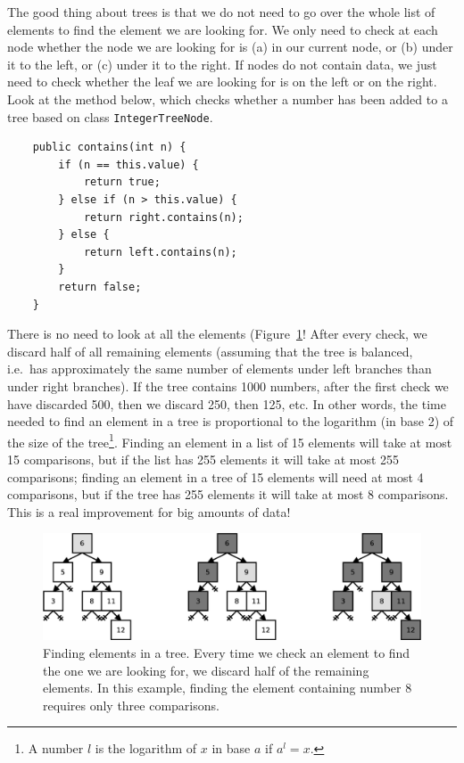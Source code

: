 The good thing about trees is that we do not need to go over the whole
list of elements to find the element we are looking for. We only need
to check at each node whether the node we are looking for is (a) in our
current node, or (b) under it to the left, or (c) under it to the right. If
nodes do not contain data, we just need to check whether the leaf we
are looking for is on the left or on the right. Look at the method
below, which checks whether a number has been added to a tree based on
class \verb+IntegerTreeNode+. 

\begin{verbatim}
    public contains(int n) {
        if (n == this.value) {
            return true;
        } else if (n > this.value) {
            return right.contains(n);
        } else {
            return left.contains(n);
        }
        return false;
    }
\end{verbatim}

There is no need to look at all the elements
(Figure~\ref{fig:fhsdhshgfhjsdg}! After every check, we
discard half of all remaining elements (assuming that the tree is
balanced, i.e.~has approximately the same number of elements under left
branches than under right branches). If the tree contains 1000
numbers, after the first check we have discarded 500, then we discard
250, then 125, etc. In other words, the time needed to find an element
in a tree is proportional to the logarithm (in base 2) of the size of
the tree\footnote{A number $l$ is the logarithm of $x$ in base $a$ if
 $a^l = x$.}. Finding an element in a list of 15 elements will take at
most 15 comparisons, but if the list has 255 elements it will take at
most 255 comparisons; finding an element in a tree of 15 elements will
need at most 4 comparisons, but if the tree has 255 elements it will
take at most 8 comparisons. This is a real improvement for big amounts
of data!

\begin{figure}[hbtp]
  \centering
  \includegraphics[width=\textwidth]{gfx/tree-find}
  \caption{Finding elements in a tree. Every time we check an element
    to find the one we are looking for, we discard half of the
    remaining elements. In this example, finding the element
    containing number 8 requires only three comparisons.}
  \label{fig:fhsdhshgfhjsdg}
\end{figure}

